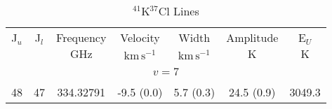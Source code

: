 \begin{table*}[htp]
\centering
\caption{$^{41}$K$^{37}$Cl Lines}
\begin{tabular}{ccccccc}
\label{tab:41K37Cl_salt_lines}
 J$_u$ & J$_l$ & Frequency & Velocity & Width & Amplitude & E$_U$ \\
  &  & $\mathrm{GHz}$ & $\mathrm{km\,s^{-1}}$ & $\mathrm{km\,s^{-1}}$ & $\mathrm{K}$ & $\mathrm{K}$ \\
\hline
\hline
&\vspace{-0.75em}\\
\multicolumn{7}{c}{$v = 7$} \\
\vspace{-0.75em}\\
 48 & 47 & 334.32791 & -9.5 (0.0) & 5.7 (0.3) & 24.5 (0.9) & 3049.3 \\
\end{tabular}

\par 
\end{table*}
